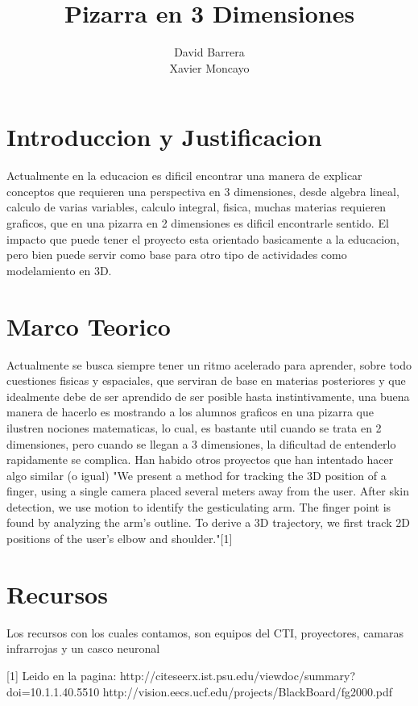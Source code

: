 \documentclass[11pt]{article} %
\title{Pizarra en 3 Dimensiones}
\author{David Barrera\\Xavier Moncayo}
\begin{document}
\maketitle
\tableofcontents
\section{Introduccion y Justificacion}
Actualmente en la educacion es dificil encontrar una manera de explicar conceptos que requieren una perspectiva en 3 dimensiones, desde algebra lineal, calculo de varias variables, calculo integral, fisica, muchas materias requieren graficos, que en una pizarra en 2 dimensiones es dificil encontrarle sentido.
El impacto que puede tener el proyecto esta orientado basicamente a la educacion, pero bien puede servir como base para otro tipo de actividades como modelamiento en 3D.
\section{Marco Teorico}
Actualmente se busca siempre tener un ritmo acelerado para aprender, sobre todo cuestiones fisicas y espaciales, que serviran de base en materias posteriores y que idealmente debe de ser aprendido de ser posible hasta instintivamente, una buena manera de hacerlo es mostrando a los alumnos graficos en una pizarra que ilustren nociones matematicas, lo cual, es bastante util cuando se trata en 2 dimensiones, pero cuando se llegan a 3 dimensiones, la dificultad de entenderlo rapidamente se complica.
Han habido otros proyectos que han intentado hacer algo similar (o igual)
"We present a method for tracking the 3D position of a finger, using a single camera placed several meters away from the user. After skin detection, we use motion to identify the gesticulating arm. The finger point is found by analyzing the arm's outline. To derive a 3D trajectory, we first track 2D positions of the user's elbow and shoulder."[1]
\section{Recursos}
Los recursos con los cuales contamos, son equipos del CTI, proyectores, camaras infrarrojas y un  casco neuronal

[1] Leido en la pagina: http://citeseerx.ist.psu.edu/viewdoc/summary?doi=10.1.1.40.5510
http://vision.eecs.ucf.edu/projects/BlackBoard/fg2000.pdf
\end{document}
